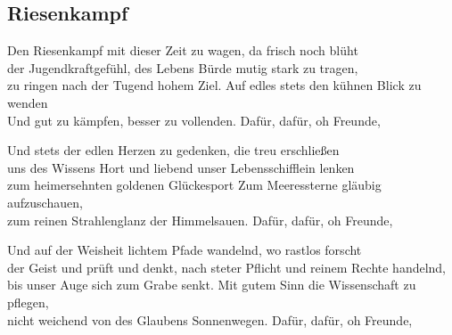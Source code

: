 
\subsection*{Riesenkampf}
%
%
%
\nopagebreak
\thestrophe Den Riesenkampf mit dieser Zeit zu wagen, da frisch noch blüht \\
der Jugendkraftgefühl, des Lebens Bürde mutig stark zu tragen, \\
zu ringen nach der Tugend hohem Ziel. Auf edles stets den kühnen Blick zu wenden \\
Und gut zu kämpfen, besser zu vollenden. Dafür, dafür, oh Freunde, \\

\thestrophe Und stets der edlen Herzen zu gedenken, die treu erschließen \\
uns des Wissens Hort und liebend unser Lebensschifflein lenken \\
zum heimersehnten goldenen Glückesport Zum Meeressterne gläubig aufzuschauen, \\
zum reinen Strahlenglanz der Himmelsauen. Dafür, dafür, oh Freunde, \\ 

\thestrophe Und auf der Weisheit lichtem Pfade wandelnd, wo rastlos forscht \\ 
der Geist und prüft und denkt, nach steter Pflicht und reinem Rechte handelnd, \\
bis unser Auge sich zum Grabe senkt. Mit gutem Sinn die Wissenschaft zu pflegen, \\
nicht weichend von des Glaubens Sonnenwegen. Dafür, dafür, oh Freunde, \\
